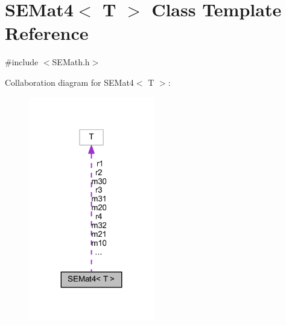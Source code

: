 \section{S\+E\+Mat4$<$ T $>$ Class Template Reference}
\label{class_s_e_mat4}


{\ttfamily \#include $<$S\+E\+Math.\+h$>$}



Collaboration diagram for S\+E\+Mat4$<$ T $>$\+:
\nopagebreak
\begin{figure}[H]
\begin{center}
\leavevmode
\includegraphics[width=155pt]{class_s_e_mat4__coll__graph}
\end{center}
\end{figure}

